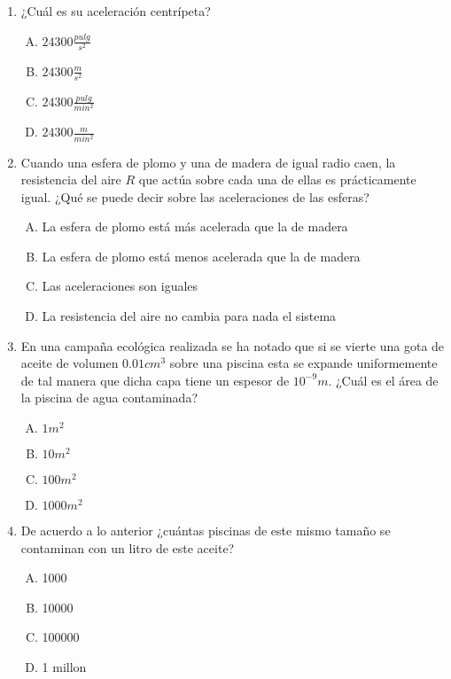 \begin{enumerate}

\item ¿Cuál es su aceleración centrípeta?\label{dia-9}

\begin{enumerate}[(A)]
\item $24300\frac{pulg}{s^2}$
\item $24300\frac{m}{s^2}$
\item $24300\frac{pulg}{min^2}$
\item $24300\frac{m}{min^2}$
\end{enumerate}

\item Cuando una esfera de plomo y una de madera de igual radio caen, la resistencia del aire $R$ que actúa sobre cada una de ellas es prácticamente igual. ¿Qu\'e se puede decir sobre las aceleraciones de las esferas?\label{dia-10}

\begin{enumerate}[(A)]
\item La esfera de plomo está más acelerada que la de madera
\item La esfera de plomo está menos acelerada que la de madera
\item Las aceleraciones son iguales
\item La resistencia del aire no cambia para nada el sistema
\end{enumerate}

\item En una campaña ecológica realizada se ha notado que si se vierte una gota de aceite de volumen $0.01cm^3$ sobre una piscina esta se expande uniformemente de tal manera que dicha capa tiene un espesor de $10^{-9}m$. ¿Cuál es el área de la piscina de agua contaminada?\label{dia-11}

\begin{enumerate}[(A)]
\item $1m^2$
\item $10m^2$
\item $100m^2$
\item $1000m^2$
\end{enumerate}

\item De acuerdo a lo anterior ¿cuántas piscinas de este mismo tamaño se contaminan con un litro de este aceite? \label{dia-12}

\begin{enumerate}[(A)]
\item 1000
\item 10000
\item 100000
\item 1 millon
\end{enumerate}


\end{enumerate}
